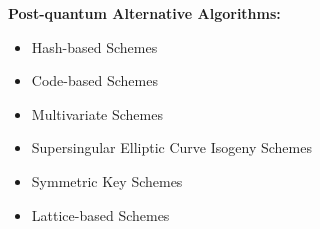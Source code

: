 \textbf{ Post-quantum Alternative Algorithms:}

\begin{itemize}
	\item Hash-based Schemes
	\item Code-based Schemes
	\item Multivariate Schemes
	\item Supersingular Elliptic Curve Isogeny Schemes
	\item Symmetric Key Schemes
	\item Lattice-based Schemes
\end{itemize}
